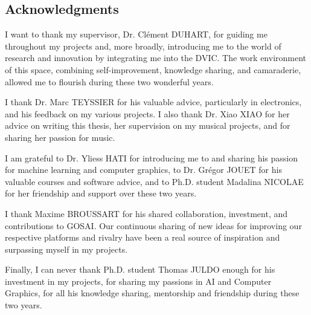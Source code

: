 \subsection*{Acknowledgments}

I want to thank my supervisor, Dr. Clément DUHART, for guiding me throughout my projects and, more broadly, introducing me to the world of research and innovation by integrating me into the DVIC. The work environment of this space, combining self-improvement, knowledge sharing, and camaraderie, allowed me to flourish during these two wonderful years.

I thank Dr. Marc TEYSSIER for his valuable advice, particularly in electronics, and his feedback on my various projects. I also thank Dr. Xiao XIAO for her advice on writing this thesis, her supervision on my musical projects, and for sharing her passion for music.

I am grateful to Dr. Yliess HATI for introducing me to and sharing his passion for machine learning and computer graphics, to Dr. Grégor JOUET for his valuable courses and software advice, and to Ph.D. student Madalina NICOLAE for her friendship and support over these two years.

I thank Maxime BROUSSART for his shared collaboration, investment, and contributions to GOSAI. Our continuous sharing of new ideas for improving our respective platforms and rivalry have been a real source of inspiration and surpassing myself in my projects.

Finally, I can never thank Ph.D. student Thomas JULDO enough for his investment in my projects, for sharing my passions in AI and Computer Graphics, for all his knowledge sharing, mentorship and friendship during these two years. 